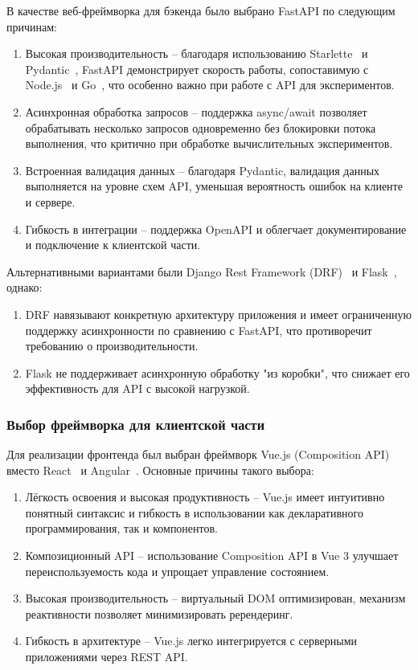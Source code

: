 В качестве веб-фреймворка для бэкенда было выбрано FastAPI по следующим причинам:
\begin{enumerate}
    \item Высокая производительность -- благодаря использованию Starlette~\cite{Framework:Starlette} и Pydantic~\cite{Library:Pydantic}, FastAPI демонстрирует скорость работы, сопоставимую с Node.js~\cite{Lang:NodeJS} и Go~\cite{Lang:Go}, что особенно важно при работе с API для экспериментов.
    \item Асинхронная обработка запросов -- поддержка async/await позволяет обрабатывать несколько запросов одновременно без блокировки потока выполнения, что критично при обработке вычислительных экспериментов.
    \item Встроенная валидация данных -- благодаря Pydantic, валидация данных выполняется на уровне схем API, уменьшая вероятность ошибок на клиенте и сервере.
    \item Гибкость в интеграции -- поддержка OpenAPI и облегчает документирование и подключение к клиентской части.
\end{enumerate}

Альтернативными вариантами были Django Rest Framework (DRF)~\cite{Framework:DRF} и Flask~\cite{Framework:Flask}, однако:
\begin{enumerate}
    \item DRF навязывают конкретную архитектуру приложения и имеет ограниченную поддержку асинхронности по сравнению с FastAPI, что противоречит требованию о производительности.
    \item Flask не поддерживает асинхронную обработку "из коробки", что снижает его эффективность для API с высокой нагрузкой.
\end{enumerate}

\subsubsection{Выбор фреймворка для клиентской части}

Для реализации фронтенда был выбран фреймворк Vue.js (Composition API) вместо React~\cite{Framework:React} и Angular~\cite{Framework:Angular}.
Основные причины такого выбора:
\begin{enumerate}
    \item Лёгкость освоения и высокая продуктивность -- Vue.js имеет интуитивно понятный синтаксис и гибкость в использовании как декларативного программирования, так и компонентов.
    \item Композиционный API -- использование Composition API в Vue 3 улучшает переиспользуемость кода и упрощает управление состоянием.
    \item Высокая производительность -- виртуальный DOM оптимизирован, механизм реактивности позволяет минимизировать ререндеринг.
    \item Гибкость в архитектуре -- Vue.js легко интегрируется с серверными приложениями через REST API.
\end{enumerate}

